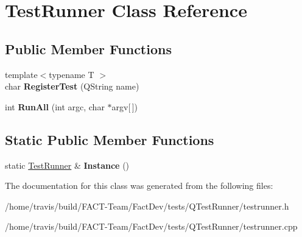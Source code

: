 \hypertarget{classTestRunner}{\section{Test\-Runner Class Reference}
\label{classTestRunner}
}
\subsection*{Public Member Functions}
\begin{DoxyCompactItemize}
\item 
\hypertarget{classTestRunner_affb5703febccf285914b08ce39e7396f}{{\footnotesize template$<$typename T $>$ }\\char {\bfseries Register\-Test} (Q\-String name)}\label{classTestRunner_affb5703febccf285914b08ce39e7396f}

\item 
\hypertarget{classTestRunner_a0a247b43d9154ab88b489051d22221e3}{int {\bfseries Run\-All} (int argc, char $\ast$argv\mbox{[}$\,$\mbox{]})}\label{classTestRunner_a0a247b43d9154ab88b489051d22221e3}

\end{DoxyCompactItemize}
\subsection*{Static Public Member Functions}
\begin{DoxyCompactItemize}
\item 
\hypertarget{classTestRunner_a4707c4680c85ce622fc375efcf39fc25}{static \hyperlink{classTestRunner}{Test\-Runner} \& {\bfseries Instance} ()}\label{classTestRunner_a4707c4680c85ce622fc375efcf39fc25}

\end{DoxyCompactItemize}


The documentation for this class was generated from the following files\-:\begin{DoxyCompactItemize}
\item 
/home/travis/build/\-F\-A\-C\-T-\/\-Team/\-Fact\-Dev/tests/\-Q\-Test\-Runner/testrunner.\-h\item 
/home/travis/build/\-F\-A\-C\-T-\/\-Team/\-Fact\-Dev/tests/\-Q\-Test\-Runner/testrunner.\-cpp\end{DoxyCompactItemize}
